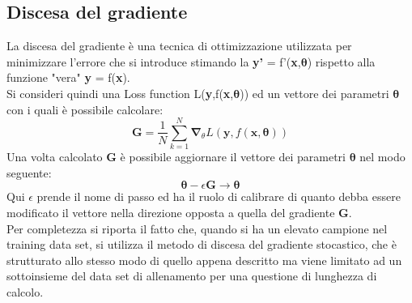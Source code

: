 \subsection{Discesa del gradiente}
\label{discesa del gradiente}
La discesa del gradiente è una tecnica di ottimizzazione utilizzata per minimizzare l'errore che si introduce stimando la \textbf{y'} = f'(\textbf{x},$\bm{\theta}$) rispetto alla funzione "vera" \textbf{y} = f(\textbf{x}). \\
Si consideri quindi una Loss function L(\textbf{y},f(\textbf{x},$\bm{\theta}$)) ed un vettore dei parametri $\bm{\theta}$ con i quali è possibile calcolare: \\
\begin{equation}
	\textbf{G} = \frac{1}{N} \sum_{k=1}^{N} \boldsymbol{\nabla}_\theta L(\textbf{y},f(\textbf{x},\bm{\theta})) 
\end{equation} 
Una volta calcolato \textbf{G} è possibile aggiornare il vettore dei parametri $\bm{\theta}$ nel modo seguente:
\begin{equation}
\bm{\theta} - \epsilon\textbf{G} \rightarrow \bm{\theta}
\end{equation}
Qui $\epsilon$ prende il nome di passo ed ha il ruolo di calibrare di quanto debba essere modificato il vettore \bm{$\theta$} nella direzione opposta a quella del gradiente \textbf{G}.\\
Per completezza si riporta il fatto che, quando si ha un elevato campione nel training data set, si utilizza il metodo di discesa del gradiente stocastico, che è strutturato allo stesso modo di quello appena descritto ma viene limitato ad un sottoinsieme del data set di allenamento per una questione di lunghezza di calcolo.\\

%
